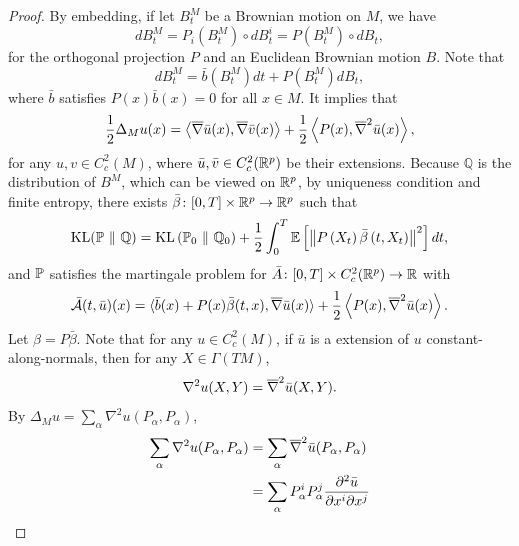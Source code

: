\begin{proof}
    By embedding, if let $B_t^M$ be a Brownian motion on $M$, we have
    \begin{equation*}
        dB_t^M = P_i(B^M_t) \circ dB^i_t = P(B^M_t) \circ dB_t,
    \end{equation*}
    for the orthogonal projection $P$ and an Euclidean Brownian motion $B$. Note that
    \begin{equation*}
        dB_t^M = \bar{b}(B^M_t)dt +  P(B^M_t) dB_t,
    \end{equation*} 
    where $\bar{b}$ satisfies $P(x)\bar{b}(x) = 0$ for all $x \in M$. It implies that
    \begin{equation*}
        \frac{1}{2}\Delta_Mu(x) = \left\langle \overline{\nabla} \bar{u}(x),\overline{\nabla} \bar{v}(x) \right\rangle + \frac{1}{2}\left\langle P(x),\overline{\nabla}^2 \bar{u}(x) \right\rangle,
    \end{equation*}
    for any $u,v \in C_c^2(M)$, where $\bar{u},\bar{v} \in C_c^2(\mathbb{R}^p)$ be their extensions. Because $\mathbb{Q}$ is the distribution of $B^M$, which can be viewed on $\mathbb{R}^p$, by uniqueness condition and finite entropy, there exists $\bar{\beta} \colon [0,T] \times \mathbb{R}^p \rightarrow \mathbb{R}^p$ such that
    \begin{equation*}
        \operatorname{KL}(\mathbb{P} ~\Vert~ \mathbb{Q})=\operatorname{KL}\left(\mathbb{P}_0 ~\Vert~ \mathbb{Q}_0\right)+\frac{1}{2} \int_0^T \mathbb{E}\left[\left\|P\left(X_t\right) \bar{\beta}\left(t, X_t\right)\right\|^2\right] d t ,
    \end{equation*}
    and $\mathbb{P}$ satisfies the martingale problem for $\bar{A} \colon [0,T] \times C^2_c(\mathbb{R}^p) \rightarrow \mathbb{R}$ with
    \begin{equation*}
        \bar{\mathcal{A}}(t, \bar{u})(x)=\langle\bar{b}(x)+ P(x) \bar{\beta}(t, x), \overline{\nabla} \bar{u}(x)\rangle+\frac{1}{2}\left\langle P(x), \overline{\nabla}^2 \bar{u}(x)\right\rangle .
    \end{equation*}
    Let $\beta = P\bar{\beta}$. Note that for any $u \in C_c^2(M)$, if $\bar{u}$ is a extension of $u$ constant-along-normals, then for any $X \in \Gamma(TM)$,
    \begin{equation*}
        \nabla^2 u(X,Y) = \overline{\nabla}^2\bar{u}(X,Y).
    \end{equation*}
    By $\Delta_M u = \sum_\alpha\nabla^2 u(P_\alpha,P_\alpha)$,
    \begin{align*}
        \sum_\alpha\nabla^2 u(P_\alpha,P_\alpha) &= \sum_\alpha\clo{\nabla}^2 \bar{u}(P_\alpha,P_\alpha) \\
        &= \sum_\alpha P_\alpha^iP_\alpha^j \frac{\partial^2 \bar{u}}{\partial x^i \partial x^j} \\

\end{align*}
\end{proof}
